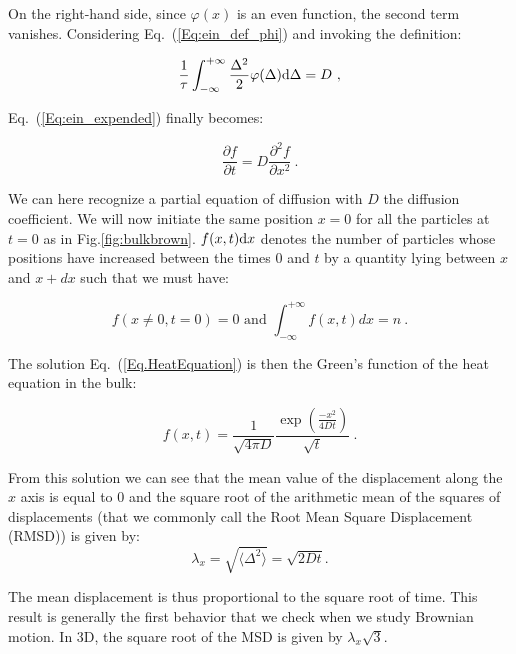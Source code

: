 On the right-hand side, since $\varphi(x)$ is an even function, the second term vanishes. Considering Eq.~(\ref{Eq:ein_def_phi}) and invoking the definition:



\begin{equation}
	\frac{1}{\tau} \int_{-\infty}^{+\infty} \frac{\Delta^2}{2}\varphi(\Delta)\textnormal{d}\Delta = D ~,
\end{equation}

Eq.~(\ref{Eq:ein_expended}) finally becomes:

\begin{equation}
	\frac{\partial f}{\partial t} = D \frac{\partial ^2 f}{\partial x ^2} ~.
	\label{Eq.HeatEquation}
\end{equation}


We can here recognize a partial equation of diffusion with $D$ the diffusion coefficient. We will now initiate the same position $x=0$ for all the particles at $t=0$ as in Fig.\ref{fig:bulkbrown}. $f(x,t)\textnormal{d}x$ denotes the number of particles whose positions have increased between the times  $0$ and $t$  by a quantity lying between $x$ and $x + dx$ such that we must have:

\begin{equation}
	f(x \ne 0, t=0) = 0 \text{ and } \int_{-\infty}^{+\infty}f(x,t)dx = n ~.
\end{equation}

The solution Eq.~(\ref{Eq.HeatEquation}) is then the Green's function of the heat equation in the bulk:


\begin{equation}
	f(x,t) = \frac{1}{\sqrt{4\pi D}} \frac{\exp \left(\frac{-x^2}{4Dt} \right)}{\sqrt{t}} ~.
\end{equation}

From this solution we can see that the mean value of the displacement along the $x$ axis is equal to $0$ and the square root of the arithmetic mean of the squares of displacements (that we commonly call the Root Mean Square Displacement (R\gls{MSD}))  is given by:
\begin{equation}
	\lambda _x = \sqrt{\langle \Delta ^2 \rangle} =  \sqrt{2Dt}.
	\label{Eq:MSD_ein}
\end{equation}

The mean displacement is thus proportional to the square root of time. This result is generally the first behavior that we check when we study Brownian motion. In 3D, the square root of the \gls{MSD} is given by $\lambda_x \sqrt{3}$.

